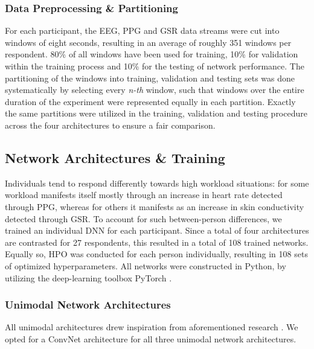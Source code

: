 \documentclass[fleqn,11pt]{paper}
\begin{document}
\subsubsection*{Data Preprocessing \& Partitioning}
For each participant, the EEG, PPG and GSR data streams were cut into windows of eight seconds, resulting in an average of roughly 351 windows per respondent. 80\% of all windows have been used for training, 10\% for validation within the training process and 10\% for the testing of network performance. The partitioning of the windows into training, validation and testing sets was done systematically by selecting every \textit{n-th} window, such that windows over the entire duration of the experiment were represented equally in each partition.  Exactly the same partitions were utilized in the training, validation and testing procedure across the four architectures to ensure a fair comparison.

\subsection{Network Architectures \& Training} \label{section:DNN}
Individuals tend to respond differently towards high workload situations: for some workload manifests itself mostly through an increase in heart rate detected through PPG, whereas for others it manifests as an increase in skin conductivity detected through GSR. To account for such between-person differences, we trained an individual DNN for each participant. Since a total of four architectures are contrasted for 27 respondents, this resulted in a total of 108 trained networks. Equally so, HPO was conducted for each person individually, resulting in 108 sets of optimized hyperparameters. All networks were constructed in Python, by utilizing the deep-learning toolbox PyTorch \cite{paszke2017automatic}. 

\subsubsection*{Unimodal Network Architectures}
All unimodal architectures drew inspiration from aforementioned research \cite{biswas2019cornet, dolmans2020perceived, schirrmeister2017deep, sun2019hybrid}. We opted for a ConvNet architecture for all three unimodal network architectures. 
\end{document}
